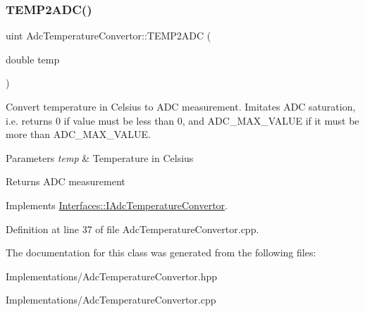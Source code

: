 \mbox{\label{class_adc_temperature_convertor_ae82f374826a431c837bdf796c593775b}} 
\subsubsection{\texorpdfstring{T\+E\+M\+P2\+A\+D\+C()}{TEMP2ADC()}}
{\footnotesize\ttfamily uint Adc\+Temperature\+Convertor\+::\+T\+E\+M\+P2\+A\+DC (\begin{DoxyParamCaption}\item[{double}]{temp }\end{DoxyParamCaption})\hspace{0.3cm}{\ttfamily [virtual]}}



Convert temperature in Celsius to A\+DC measurement. Imitates A\+DC saturation, i.\+e. returns 0 if value must be less than 0, and A\+D\+C\+\_\+\+M\+A\+X\+\_\+\+V\+A\+L\+UE if it must be more than A\+D\+C\+\_\+\+M\+A\+X\+\_\+\+V\+A\+L\+UE. 


\begin{DoxyParams}{Parameters}
{\em temp} & Temperature in Celsius \\
\hline
\end{DoxyParams}
\begin{DoxyReturn}{Returns}
A\+DC measurement 
\end{DoxyReturn}


Implements \hyperlink{class_interfaces_1_1_i_adc_temperature_convertor_ab5d3453ecc41848b723a790fe7e01f79}{Interfaces\+::\+I\+Adc\+Temperature\+Convertor}.



Definition at line 37 of file Adc\+Temperature\+Convertor.\+cpp.



The documentation for this class was generated from the following files\+:\begin{DoxyCompactItemize}
\item 
Implementations/Adc\+Temperature\+Convertor.\+hpp\item 
Implementations/Adc\+Temperature\+Convertor.\+cpp\end{DoxyCompactItemize}

